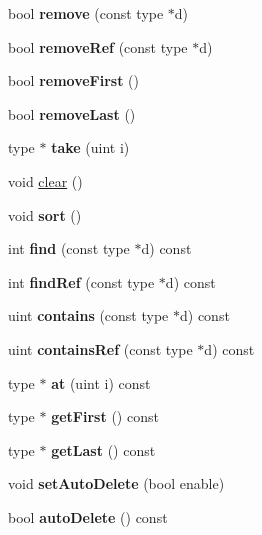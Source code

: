 \begin{DoxyCompactItemize}
bool {\bfseries remove} (const type $\ast$d)
\item 
\mbox{\label{class_q_list_a8338711a13d4630618f948f82eabdaa3}} 
bool {\bfseries remove\+Ref} (const type $\ast$d)
\item 
\mbox{\label{class_q_list_a2c39668089649a631e8573f8a8916023}} 
bool {\bfseries remove\+First} ()
\item 
\mbox{\label{class_q_list_a1bb7034d6be02074853229d526b6f1f1}} 
bool {\bfseries remove\+Last} ()
\item 
\mbox{\label{class_q_list_a6810f92c936ad709f71f3ed2b5185bde}} 
type $\ast$ {\bfseries take} (uint i)
\item 
void \mbox{\hyperlink{class_q_list_a3cc1e3b2eb4a0db55eb5a594bd67d059}{clear}} ()
\item 
\mbox{\label{class_q_list_aaaf4f113db543904c9dd822e9231031c}} 
void {\bfseries sort} ()
\item 
\mbox{\label{class_q_list_ad36068ae8e6b44ba0a1e15706037769c}} 
int {\bfseries find} (const type $\ast$d) const
\item 
\mbox{\label{class_q_list_a3195e89bce215f3fad3091f235601d5c}} 
int {\bfseries find\+Ref} (const type $\ast$d) const
\item 
\mbox{\label{class_q_list_a0a1c6d25c822db5740b13216f342f230}} 
uint {\bfseries contains} (const type $\ast$d) const
\item 
\mbox{\label{class_q_list_a2269e006a55d31bfd887fb5bf116a83d}} 
uint {\bfseries contains\+Ref} (const type $\ast$d) const
\item 
\mbox{\label{class_q_list_a4e2ea4a00873927fc251abd281a7356d}} 
type $\ast$ {\bfseries at} (uint i) const
\item 
\mbox{\label{class_q_list_a1c507382b345b90d571d8b49f1b03d2e}} 
type $\ast$ {\bfseries get\+First} () const
\item 
\mbox{\label{class_q_list_a54bd43258ef5becb8c258b9c8ed49729}} 
type $\ast$ {\bfseries get\+Last} () const
\item 
\mbox{\label{class_q_list_a69128ab98c6667512c4b2d3837d1786f}} 
void {\bfseries set\+Auto\+Delete} (bool enable)
\item 
\mbox{\label{class_q_list_a87733d20fc8b2048df424a1a8aa6ffa4}} 
bool {\bfseries auto\+Delete} () const
\end{DoxyCompactItemize}


